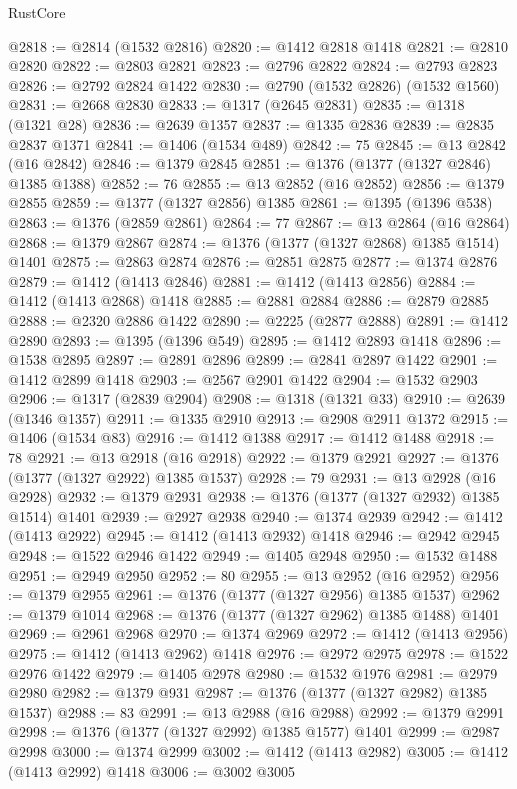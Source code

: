 \begin{lexlean}{RustCore}
\begin{coremodule}
@2818 := @2814 (@1532 @2816)
@2820 := @1412 @2818 @1418
@2821 := @2810 @2820
@2822 := @2803 @2821
@2823 := @2796 @2822
@2824 := @2793 @2823
@2826 := @2792 @2824 @1422
@2830 := @2790 (@1532 @2826) (@1532 @1560)
@2831 := @2668 @2830
@2833 := @1317 (@2645 @2831)
@2835 := @1318 (@1321 @28)
@2836 := @2639 @1357
@2837 := @1335 @2836
@2839 := @2835 @2837 @1371
@2841 := @1406 (@1534 @489)
@2842 := 75
@2845 := @13 @2842 (@16 @2842)
@2846 := @1379 @2845
@2851 := @1376 (@1377 (@1327 @2846) @1385 @1388)
@2852 := 76
@2855 := @13 @2852 (@16 @2852)
@2856 := @1379 @2855
@2859 := @1377 (@1327 @2856) @1385
@2861 := @1395 (@1396 @538)
@2863 := @1376 (@2859 @2861)
@2864 := 77
@2867 := @13 @2864 (@16 @2864)
@2868 := @1379 @2867
@2874 := @1376 (@1377 (@1327 @2868) @1385 @1514) @1401
@2875 := @2863 @2874
@2876 := @2851 @2875
@2877 := @1374 @2876
@2879 := @1412 (@1413 @2846)
@2881 := @1412 (@1413 @2856)
@2884 := @1412 (@1413 @2868) @1418
@2885 := @2881 @2884
@2886 := @2879 @2885
@2888 := @2320 @2886 @1422
@2890 := @2225 (@2877 @2888)
@2891 := @1412 @2890
@2893 := @1395 (@1396 @549)
@2895 := @1412 @2893 @1418
@2896 := @1538 @2895
@2897 := @2891 @2896
@2899 := @2841 @2897 @1422
@2901 := @1412 @2899 @1418
@2903 := @2567 @2901 @1422
@2904 := @1532 @2903
@2906 := @1317 (@2839 @2904)
@2908 := @1318 (@1321 @33)
@2910 := @2639 (@1346 @1357)
@2911 := @1335 @2910
@2913 := @2908 @2911 @1372
@2915 := @1406 (@1534 @83)
@2916 := @1412 @1388
@2917 := @1412 @1488
@2918 := 78
@2921 := @13 @2918 (@16 @2918)
@2922 := @1379 @2921
@2927 := @1376 (@1377 (@1327 @2922) @1385 @1537)
@2928 := 79
@2931 := @13 @2928 (@16 @2928)
@2932 := @1379 @2931
@2938 := @1376 (@1377 (@1327 @2932) @1385 @1514) @1401
@2939 := @2927 @2938
@2940 := @1374 @2939
@2942 := @1412 (@1413 @2922)
@2945 := @1412 (@1413 @2932) @1418
@2946 := @2942 @2945
@2948 := @1522 @2946 @1422
@2949 := @1405 @2948
@2950 := @1532 @1488
@2951 := @2949 @2950
@2952 := 80
@2955 := @13 @2952 (@16 @2952)
@2956 := @1379 @2955
@2961 := @1376 (@1377 (@1327 @2956) @1385 @1537)
@2962 := @1379 @1014
@2968 := @1376 (@1377 (@1327 @2962) @1385 @1488) @1401
@2969 := @2961 @2968
@2970 := @1374 @2969
@2972 := @1412 (@1413 @2956)
@2975 := @1412 (@1413 @2962) @1418
@2976 := @2972 @2975
@2978 := @1522 @2976 @1422
@2979 := @1405 @2978
@2980 := @1532 @1976
@2981 := @2979 @2980
@2982 := @1379 @931
@2987 := @1376 (@1377 (@1327 @2982) @1385 @1537)
@2988 := 83
@2991 := @13 @2988 (@16 @2988)
@2992 := @1379 @2991
@2998 := @1376 (@1377 (@1327 @2992) @1385 @1577) @1401
@2999 := @2987 @2998
@3000 := @1374 @2999
@3002 := @1412 (@1413 @2982)
@3005 := @1412 (@1413 @2992) @1418
@3006 := @3002 @3005

\end{coremodule}
\end{lexlean}
